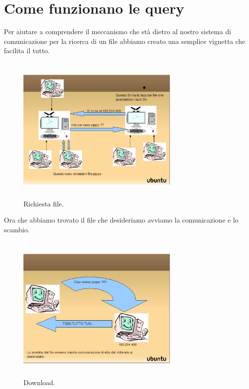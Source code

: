 \section{Come funzionano le query}\label{sec:risposte_vuote}
Per aiutare a comprendere il meccanismo che stà dietro al nostro sistema di comunicazione per la ricerca di un file abbiamo creato una semplice vignetta che facilita il tutto.
\begin{figure}[t]
 \centering
 \includegraphics[width=300px,height=275px,bb=14 14 841 737]{images/pippo.eps}
 \caption{Richiesta file.}
 \label{fig:richiesta_file}
\end{figure}
Ora che abbiamo trovato il file che desideriamo avviamo la comunicazione e lo scambio.
\begin{figure}[t]
 \centering
 \includegraphics[width=300px,height=275px,bb=14 14 841 737]{images/pluto.eps}
 \caption{Download.}
 \label{fig:download}
\end{figure}

